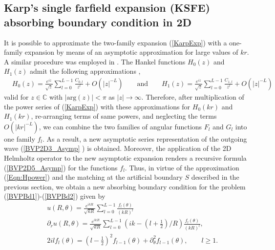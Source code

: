 \documentclass[final,3p,times,12pt]{elsarticle}
\begin{document}

\subsection{Karp's single farfield expansion (KSFE) absorbing boundary condition in 2D} \label{Section.ABC2DAsymp}


It is possible to approximate the two-family expansion (\ref{KarpExp}) with a one-family expansion by means of an asymptotic approximation for large values of $kr$. A similar procedure was employed in \cite{Bayliss01}. The Hankel functions $H_{0}(z)$ and $H_{1}(z)$ admit the following approximations \cite[\S 9.2]{HandMathFunct}, 
\begin{align}
& H_{0}(z) = \frac{e^{i z}}{\sqrt{z}} \sum_{l=0}^{L-1} \frac{C_{0,l}}{z^l} + O(|z|^{-L}) \qquad \text{and} \qquad H_{1}(z) = \frac{e^{i z}}{\sqrt{z}} \sum_{l=0}^{L-1} \frac{C_{1,l}}{z^l} + O(|z|^{-L}) \label{Eqn:Hpower}
\end{align}
valid for $z \in \mathbb{C}$ with $| \text{arg}(z) | < \pi$ as $|z| \to \infty$. Therefore, after multiplication of the power series of (\ref{KarpExp}) with these approximations for $H_{0}(kr)$ and $H_{1}(kr)$, re-arranging terms of same powers, and neglecting the terms $O(|kr|^{-L})$, we can combine the two families of angular functions $F_l$ and $G_l$ into one family $f_l$. As a result, a new asymptotic series representation of the outgoing wave (\ref{BVP2D3_Asymp} ) is obtained.
Moreover, the application of the 2D Helmholtz operator to the new asymptotic expansion renders a recursive formula (\ref{BVP2D5_Asymp}) for the functions $f_{l}$.  {Thus, in virtue of the approximation (\ref{Eqn:Hpower}) and the matching at the artificial boundary $S$ described in the previous section,  we obtain a new absorbing boundary condition for the  problem (\ref{BVPBd1})-(\ref{BVPBd2}) given by}
\begin{eqnarray}
&& u(R,\theta)=\frac{e^{ikR}}{\sqrt{kR}}\sum_{l=0}^{L-1} \frac{f_l(\theta)}{(kR)^l}\label{BVP2D3_Asymp} \\
&&\partial_{r} u(R,\theta) =  \frac{e^{i k R}}{\sqrt{k R}} \sum_{l=0}^{L-1} \left( ik - \left( l +\tfrac{1}{2} \right)/R  \right) \frac{f_l(\theta)}{(kR)^l}, \label{BVP2D4_Asymp}\\
&& 2 i l f_{l}(\theta) = \left( l - \tfrac{1}{2} \right)^2 f_{l-1}(\theta) + \partial_{\theta}^{2} f_{l-1}(\theta), \qquad l \geq 1. \label{BVP2D5_Asymp}
\end{eqnarray}
\end{document}

